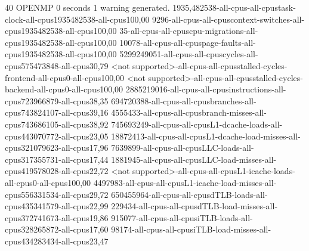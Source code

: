 
40
OPENMP
0 seconds
1 warning generated.
1935,482538-all-cpus-all-cpustask-clock-all-cpus1935482538-all-cpus100,00
9296-all-cpus-all-cpuscontext-switches-all-cpus1935482538-all-cpus100,00
35-all-cpus-all-cpuscpu-migrations-all-cpus1935482538-all-cpus100,00
10078-all-cpus-all-cpuspage-faults-all-cpus1935482538-all-cpus100,00
5299249051-all-cpus-all-cpuscycles-all-cpus575473848-all-cpus30,79
<not supported>-all-cpus-all-cpusstalled-cycles-frontend-all-cpus0-all-cpus100,00
<not supported>-all-cpus-all-cpusstalled-cycles-backend-all-cpus0-all-cpus100,00
2885219016-all-cpus-all-cpusinstructions-all-cpus723966879-all-cpus38,35
694720388-all-cpus-all-cpusbranches-all-cpus743824107-all-cpus39,16
4555433-all-cpus-all-cpusbranch-misses-all-cpus743686105-all-cpus38,92
745693249-all-cpus-all-cpusL1-dcache-loads-all-cpus443070772-all-cpus23,05
18872413-all-cpus-all-cpusL1-dcache-load-misses-all-cpus321079623-all-cpus17,96
7639899-all-cpus-all-cpusLLC-loads-all-cpus317355731-all-cpus17,44
1881945-all-cpus-all-cpusLLC-load-misses-all-cpus419578028-all-cpus22,72
<not supported>-all-cpus-all-cpusL1-icache-loads-all-cpus0-all-cpus100,00
4497983-all-cpus-all-cpusL1-icache-load-misses-all-cpus556331534-all-cpus29,72
650455964-all-cpus-all-cpusdTLB-loads-all-cpus435341579-all-cpus22,99
229434-all-cpus-all-cpusdTLB-load-misses-all-cpus372741673-all-cpus19,86
915077-all-cpus-all-cpusiTLB-loads-all-cpus328265872-all-cpus17,60
98174-all-cpus-all-cpusiTLB-load-misses-all-cpus434283434-all-cpus23,47
